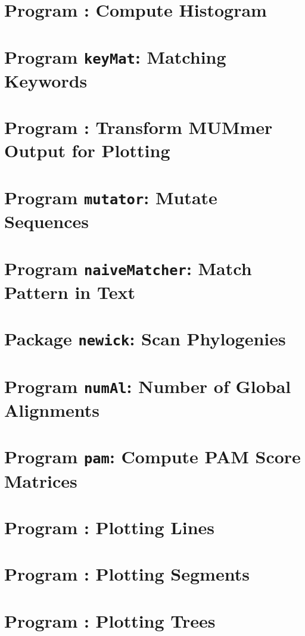 \documentclass[a4paper]{report}
\begin{document}
\chapter{Program : Compute Histogram}\label{ch:his}

\chapter{Program \texttt{keyMat}: Matching Keywords}\label{ch:km}

\chapter{Program : Transform MUMmer Output for
  Plotting}\label{ch:m2p}

\chapter{Program \texttt{mutator}: Mutate Sequences}\label{ch:mut}

\chapter{Program \texttt{naiveMatcher}: Match Pattern in
  Text}\label{ch:nm}

\chapter{Package \texttt{newick}: Scan Phylogenies}\label{ch:new}

\chapter{Program \texttt{numAl}: Number of Global Alignments}\label{ch:num}

\chapter{Program \texttt{pam}: Compute PAM Score
  Matrices}\label{ch:pam}

\chapter{Program : Plotting Lines}\label{ch:pl}

\chapter{Program : Plotting Segments}\label{ch:ps}

\chapter{Program : Plotting Trees}\label{ch:pt}

\end{document}
